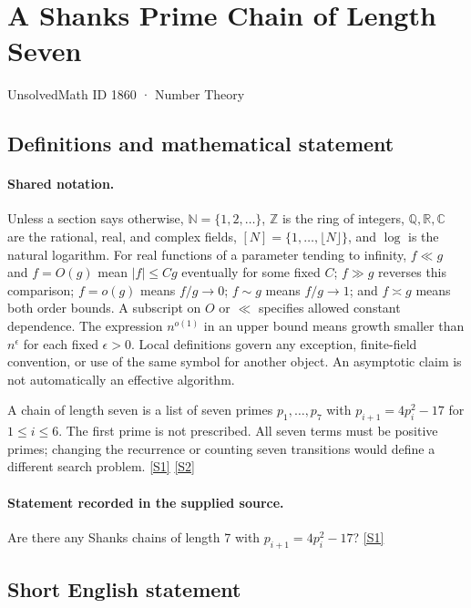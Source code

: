 \documentclass[11pt,a4paper]{article}
\newcommand{\N}{\mathbb{N}}
\newcommand{\Z}{\mathbb{Z}}
\newcommand{\Q}{\mathbb{Q}}
\newcommand{\R}{\mathbb{R}}
\newcommand{\C}{\mathbb{C}}
\newcommand{\sref}[2]{\hyperlink{source:#1:#2}{[S#2]}}
\begin{document}

\setcounter{section}{1859}

\section{A Shanks Prime Chain of Length Seven}\label{1860}

{\small\sffamily UnsolvedMath ID 1860 · Number Theory}

\subsection{Definitions and mathematical statement}

\paragraph{Shared notation.}Unless a section says otherwise, $\N=\{1,2,\ldots\}$,
$\Z$ is the ring of integers, $\Q,\R,\C$ are the rational, real, and complex
fields, $[N]=\{1,\ldots,\lfloor N\rfloor\}$, and $\log$ is the natural
logarithm. For real functions of a parameter tending to infinity,
$f\ll g$ and $f=O(g)$ mean $|f|\leq Cg$ eventually for some fixed $C$;
$f\gg g$ reverses this comparison; $f=o(g)$ means $f/g\to0$;
$f\sim g$ means $f/g\to1$; and $f\asymp g$ means both order bounds.
A subscript on $O$ or $\ll$ specifies allowed constant dependence.
The expression $n^{o(1)}$ in an upper bound means growth smaller than
$n^\epsilon$ for each fixed $\epsilon>0$. Local definitions govern any
exception, finite-field convention, or use of the same symbol for another
object. An asymptotic claim is not automatically an effective algorithm.



A chain of length seven is a list of seven primes $p_1,\ldots,p_7$ with $p_{i+1}=4p_i^2-17$ for $1\leq i\leq6$. The first prime is not prescribed. All seven terms must be positive primes; changing the recurrence or counting seven transitions would define a different search problem. \sref{1860}{1} \sref{1860}{2}

\paragraph{Statement recorded in the supplied source.}
Are there any Shanks chains of length 7 with $p_{i+1} = 4p_i^2 - 17$? \sref{1860}{1}

\subsection{Short English statement}
\end{document}
